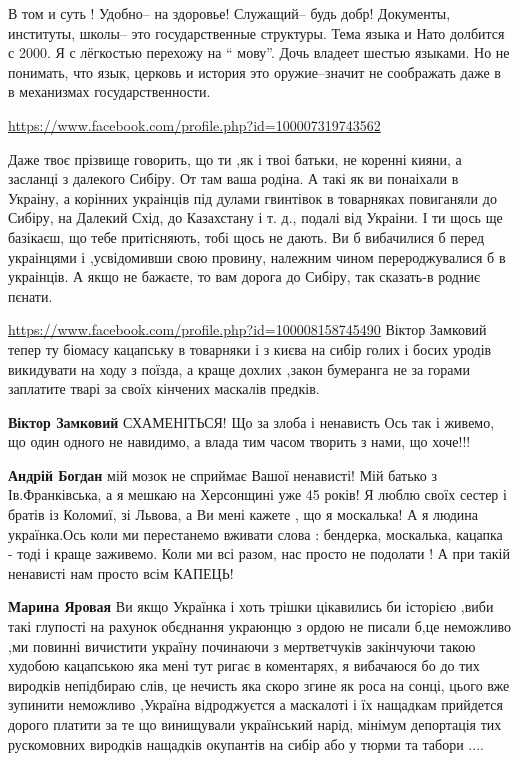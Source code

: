\begin{itemize}
\begin{itemize}

В том и суть ! Удобно-- на здоровье! Служащий-- будь добр! Документы,
институты, школы-- это государственные структуры. Тема языка и Нато долбится с
2000. Я с лёгкостью перехожу на \enquote{ мову}. Дочь владеет шестью языками. Но не
понимать, что язык, церковь и история это оружие--значит не соображать даже в в
механизмах государственности.

\end{itemize}

\url{https://www.facebook.com/profile.php?id=100007319743562}

Даже твоє прізвище говорить, що ти ,як і твоі батьки, не коренні кияни, а
засланці з далекого Сибіру. От там ваша родіна. А такі як ви понаіхали в
Украіну, а корінних украінців під дулами гвинтівок в товарняках повиганяли до
Сибіру, на Далекий Схід, до Казахстану і т. д., подалі від Украіни. І ти щось
ще базікаєш, що тебе притісняють, тобі щось не дають. Ви б вибачилися б перед
украінцями і ,усвідомивши свою провину, належним чином перероджувалися б в
украінців. А якщо не бажаєте, то вам дорога до Сибіру, так сказать-в родниє
пєнати.

\begin{itemize}

\url{https://www.facebook.com/profile.php?id=100008158745490}
Віктор Замковий тепер ту біомасу кацапську в товарняки і з києва на сибір голих і босих уродів викидувати на ходу з поїзда, а краще дохлих ,закон бумеранга не за горами заплатите тварі за своїх кінчених маскалів предків.

\textbf{Віктор Замковий} СХАМЕНІТЬСЯ! Що за злоба і ненависть Ось так і живемо,
що один одного не навидимо, а влада тим часом творить з нами, що хоче!!!

\textbf{Андрій Богдан} мій мозок не сприймає Вашої ненависті! Мій батько з
Ів.Франківська, а я мешкаю на Херсонщині уже 45 років! Я люблю своїх сестер і
братів із Коломиї, зі Львова, а Ви мені кажете , що я москалька! А я людина
українка.Ось коли ми перестанемо вживати слова : бендерка, москалька, кацапка -
тоді і краще заживемо. Коли ми всі разом, нас просто не подолати ! А при такій
ненависті нам просто всім КАПЕЦЬ!

\textbf{Марина Яровая} Ви якщо Українка і хоть трішки цікавились би історією
,виби такі глупості на рахунок обєднання украюнцю з ордою не писали б,це
неможливо ,ми повинні вичистити україну починаючи з мертветчуків закінчуючи
такою худобою кацапською яка мені тут ригає в коментарях, я вибачаюся бо до тих
виродків непідбираю слів, це нечисть яка скоро згине як роса на сонці, цього
вже зупинити неможливо ,Україна відроджуєтся а маскалоті і їх нащадкам
прийдется дорого платити за те що винищували український нарід, мінімум
депортація тих рускомовних виродків нащадків окупантів на сибір або у тюрми та
табори ....



\end{itemize}
\end{itemize}
